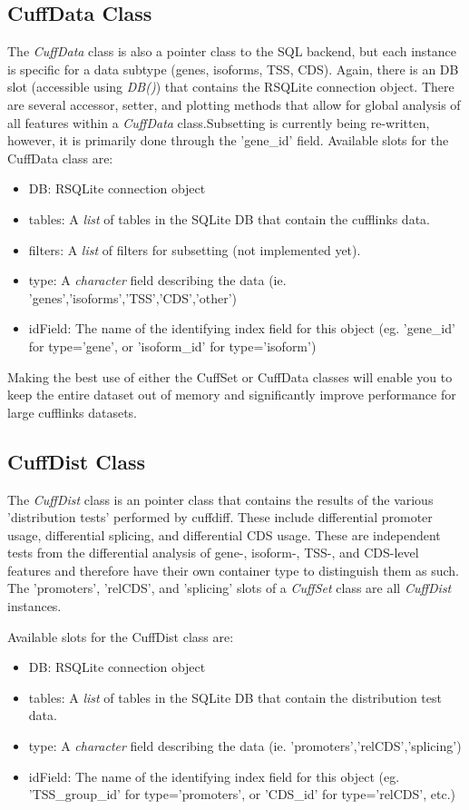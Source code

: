 \documentclass[10pt]{article}
\newcommand{\Rclass}[1]{{\textit{#1}}}
\newcommand{\Rmethod}[1]{{\textit{#1}}}
\begin{document}
\subsection{CuffData Class}
	The \Rclass{CuffData} class is also a pointer class to the SQL backend, but each instance is specific for a data subtype (genes, isoforms, TSS, CDS). Again, there is an DB slot (accessible using \Rmethod{DB()}) that contains the RSQLite connection object.
	There are several accessor, setter, and plotting methods that allow for global analysis of all features within a \Rmethod{CuffData} class.Subsetting is currently being re-written, however, it is primarily done through the 'gene\_id' field.
	Available slots for the CuffData class are: 
	\begin{itemize}
		\item DB: RSQLite connection object
		\item tables: A \Rclass{list} of tables in the SQLite DB that contain the cufflinks data.
		\item filters: A \Rclass{list} of filters for subsetting (not implemented yet).
		\item type: A \Rclass{character} field describing the data (ie. 'genes','isoforms','TSS','CDS','other')
		\item idField: The name of the identifying index field for this object (eg. 'gene\_id' for type='gene', or 'isoform\_id' for type='isoform')
	\end{itemize}
	Making the best use of either the CuffSet or CuffData classes will enable you to keep the entire dataset out of memory and significantly improve performance for large cufflinks datasets.

\subsection{CuffDist Class}
	The \Rclass{CuffDist} class is an pointer class that contains the results of the various 'distribution tests' performed by cuffdiff.  These include differential promoter usage, differential splicing, and differential CDS usage.  These are independent tests from the differential analysis of gene-, isoform-, TSS-, and CDS-level features and therefore
	have their own container type to distinguish them as such.  The 'promoters', 'relCDS', and 'splicing' slots of a \Rclass{CuffSet} class are all \Rclass{CuffDist} instances.
	
	Available slots for the CuffDist class are:
	\begin{itemize}
	\item DB: RSQLite connection object
		\item tables: A \Rclass{list} of tables in the SQLite DB that contain the distribution test data.
		\item type: A \Rclass{character} field describing the data (ie. 'promoters','relCDS','splicing')
		\item idField: The name of the identifying index field for this object (eg. 'TSS\_group\_id' for type='promoters', or 'CDS\_id' for type='relCDS', etc.)
	\end{itemize}
\end{document}
